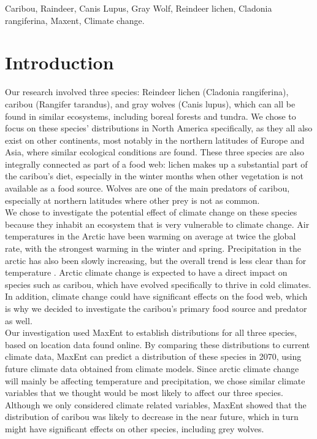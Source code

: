 \documentclass[twoside]{article}
\begin{document}
\begin{framed}
\begin{abstract}
\end{abstract}

\begin{keywords}

Caribou,
Raindeer,
Canis Lupus,
Gray Wolf,
Reindeer lichen,
Cladonia rangiferina,
Maxent,
Climate change.

\end{keywords}

\end{framed}

\section{Introduction}
Our research involved three species: Reindeer lichen (Cladonia rangiferina),
caribou (Rangifer tarandus), and gray wolves (Canis lupus), which can all be
found in similar ecosystems, including boreal forests and tundra. We chose to
focus on these species’ distributions in North America specifically, as they
all also exist on other continents, most notably in the northern latitudes of
Europe and Asia, where similar ecological conditions are found. These three
species are also integrally connected as part of a food web: lichen makes up
a substantial part of the caribou’s diet, especially in the winter months when
other vegetation is not available as a food source. Wolves are one of the main
predators of caribou, especially at northern latitudes where other prey is not
as common. \\
We chose to investigate the potential effect of climate change on these species
because they inhabit an ecosystem that is very vulnerable to climate change.
Air temperatures in the Arctic have been warming on average at twice the global
rate, with the strongest warming in the winter and spring. Precipitation in the
arctic has also been slowly increasing, but the overall trend is less clear
than for temperature \cite{ipcc4ar}. Arctic climate change is
expected to have a direct impact on species such as caribou, which have evolved
specifically to thrive in cold climates. In addition, climate change could have
significant effects on the food web, which is why we decided to investigate the
caribou’s primary food source and predator as well. \\
Our investigation used MaxEnt to establish distributions for all three species,
based on location data found online. By comparing these distributions to current
climate data, MaxEnt can predict a distribution of these species in 2070, using
future climate data obtained from climate models. Since arctic climate change
will mainly be affecting temperature and precipitation, we chose similar
climate variables that we thought would be most likely to affect our three
species. Although we only considered climate related variables, MaxEnt showed
that the distribution of caribou was likely to decrease in the near future,
which in turn might have significant effects on other species, including
grey wolves.
\end{document}
